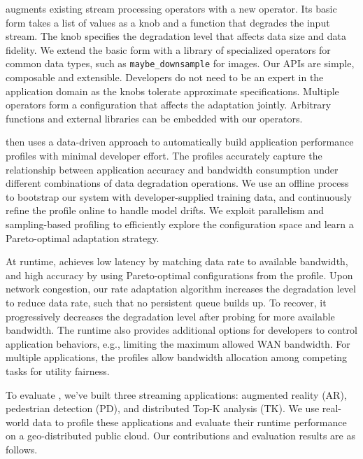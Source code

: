 \sysname{} augments existing stream processing operators with a new \maybe{}
operator. Its basic form takes a list of values as a knob and a function that
degrades the input stream. The knob specifies the degradation level that affects
data size and data fidelity. We extend the basic form with a library of
specialized operators for common data types, such as \texttt{maybe\_downsample}
for images. Our APIs are simple, composable and extensible. Developers do not
need to be an expert in the application domain as the knobs tolerate approximate
specifications. Multiple operators form a configuration that affects the
adaptation jointly. Arbitrary functions and external libraries can be embedded
with our operators.

\sysname{} then uses a data-driven approach to automatically build application
performance profiles with minimal developer effort. The profiles accurately
capture the relationship between application accuracy and bandwidth consumption
under different combinations of data degradation operations. We use an offline
process to bootstrap our system with developer-supplied training data, and
continuously refine the profile online to handle model drifts. We exploit
parallelism and sampling-based profiling to efficiently explore the
configuration space and learn a Pareto-optimal adaptation strategy.

At runtime, \sysname{} achieves low latency by matching data rate to available
bandwidth, and high accuracy by using Pareto-optimal configurations from the
profile. Upon network congestion, our rate adaptation algorithm increases the
degradation level to reduce data rate, such that no persistent queue builds
up. To recover, it progressively decreases the degradation level after probing
for more available bandwidth. The runtime also provides additional options for
developers to control application behaviors, e.g., limiting the maximum allowed
WAN bandwidth. For multiple applications, the profiles allow bandwidth
allocation among competing tasks for utility fairness.

To evaluate \sysname{}, we've built three streaming applications: augmented
reality (AR), pedestrian detection (PD), and distributed Top-K analysis (TK). We
use real-world data to profile these applications and evaluate their runtime
performance on a geo-distributed public cloud. Our contributions and evaluation
results are as follows.

